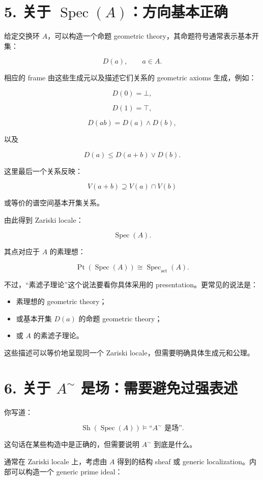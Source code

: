 \documentclass{ctexart}
\begin{document}
\section*{5. 关于 \(\operatorname{Spec}(A)\)：方向基本正确}

给定交换环 \(A\)，可以构造一个命题 geometric theory，其命题符号通常表示基本开集：

\[
D(a),\qquad a\in A.
\]

相应的 frame 由这些生成元以及描述它们关系的 geometric axioms 生成，例如：

\[
D(0)=\bot,
\]

\[
D(1)=\top,
\]

\[
D(ab)=D(a)\wedge D(b),
\]

以及

\[
D(a)\le D(a+b)\vee D(b).
\]

这里最后一个关系反映：

\[
V(a+b)\supseteq V(a)\cap V(b)
\]

或等价的谱空间基本开集关系。

由此得到 Zariski locale：

\[
\operatorname{Spec}(A).
\]

其点对应于 \(A\) 的素理想：

\[
\operatorname{Pt}(\operatorname{Spec}(A))
\cong
\operatorname{Spec}_{\mathrm{set}}(A).
\]

不过，``素滤子理论''这个说法要看你具体采用的 presentation。更常见的说法是：

\begin{itemize}
\item 素理想的 geometric theory；
\item 或基本开集 \(D(a)\) 的命题 geometric theory；
\item 或 \(A\) 的素滤子理论。
\end{itemize}

这些描述可以等价地呈现同一个 Zariski locale，但需要明确具体生成元和公理。

\section*{6. 关于 \(A^\sim\) 是场：需要避免过强表述}

你写道：

\[
\operatorname{Sh}(\operatorname{Spec}(A))
\models
\text{``\(A^\sim\) 是场''}.
\]

这句话在某些构造中是正确的，但需要说明 \(A^\sim\) 到底是什么。

通常在 Zariski locale 上，考虑由 \(A\) 得到的结构 sheaf 或 generic localization。内部可以构造一个 generic prime ideal：
\end{document}
